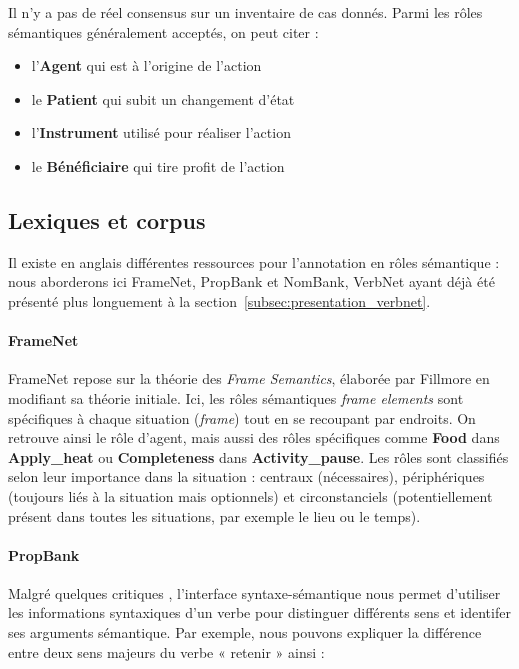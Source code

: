 Il n'y a pas de réel consensus sur un inventaire de cas donnés. Parmi les rôles
sémantiques généralement acceptés, on peut citer :

\begin{itemize}
    \item l'\textbf{Agent} qui est à l'origine de l'action
    \item le \textbf{Patient} qui subit un changement d'état
    \item l'\textbf{Instrument} utilisé pour réaliser l'action
    \item le \textbf{Bénéficiaire} qui tire profit de l'action
\end{itemize}

\subsection{Lexiques et corpus}

Il existe en anglais différentes ressources pour l'annotation en rôles
sémantique : nous aborderons ici FrameNet, PropBank et NomBank, VerbNet ayant
déjà été présenté plus longuement à la
section~\ref{subsec:presentation_verbnet}. 

\paragraph{FrameNet}

FrameNet repose sur la théorie des \textit{Frame Semantics}, élaborée par
Fillmore en modifiant sa théorie initiale. Ici, les rôles sémantiques
\textit{frame elements} sont spécifiques à chaque situation (\textit{frame})
tout en se recoupant par endroits. On retrouve ainsi le rôle d'agent, mais
aussi des rôles spécifiques comme \textbf{Food} dans \textbf{Apply\_heat} ou
\textbf{Completeness} dans \textbf{Activity\_pause}. Les rôles sont classifiés
selon leur importance dans la situation : centraux (nécessaires), périphériques
(toujours liés à la situation mais optionnels) et circonstanciels
(potentiellement présent dans toutes les situations, par exemple le lieu ou le
temps).

\paragraph{PropBank}

Malgré quelques critiques \citep{riemer2011conception}, l'interface
syntaxe-sémantique nous permet d'utiliser les informations syntaxiques d'un
verbe pour distinguer différents sens et identifer ses arguments sémantique.
Par exemple, nous pouvons expliquer la différence entre deux sens majeurs du
verbe « retenir » ainsi :

